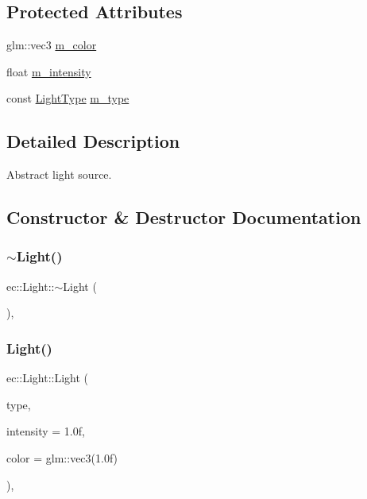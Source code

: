 \subsection*{Protected Attributes}
\begin{DoxyCompactItemize}
\item 
glm\+::vec3 \mbox{\hyperlink{classec_1_1_light_a7dfc41f1e8f2d7ddad97d60c610c302e}{m\+\_\+color}}
\item 
float \mbox{\hyperlink{classec_1_1_light_ac655cc4148d5aa4d052bace97770f3b1}{m\+\_\+intensity}}
\item 
const \mbox{\hyperlink{namespaceec_a30e2a743ebdeb02ac68a6cfa50f629c7}{Light\+Type}} \mbox{\hyperlink{classec_1_1_light_ae3d04075982c6c62e7687b214a504c30}{m\+\_\+type}}
\end{DoxyCompactItemize}


\subsection{Detailed Description}
Abstract light source. 

\subsection{Constructor \& Destructor Documentation}
\mbox{\label{classec_1_1_light_af9024a28fff2403705d1a6e9cad4a128}} 
\subsubsection{\texorpdfstring{$\sim$\+Light()}{~Light()}}
{\footnotesize\ttfamily ec\+::\+Light\+::$\sim$\+Light (\begin{DoxyParamCaption}{ }\end{DoxyParamCaption})\hspace{0.3cm}{\ttfamily [virtual]}, {\ttfamily [default]}}

\mbox{\label{classec_1_1_light_a7816fc3b8f92cd0ac732be6944754995}} 
\subsubsection{\texorpdfstring{Light()}{Light()}}
{\footnotesize\ttfamily ec\+::\+Light\+::\+Light (\begin{DoxyParamCaption}\item[{\mbox{\hyperlink{namespaceec_a30e2a743ebdeb02ac68a6cfa50f629c7}{Light\+Type}}}]{type,  }\item[{float}]{intensity = {\ttfamily 1.0f},  }\item[{const glm\+::vec3 \&}]{color = {\ttfamily glm\+:\+:vec3(1.0f)} }\end{DoxyParamCaption})\hspace{0.3cm}{\ttfamily [explicit]}, {\ttfamily [protected]}}



